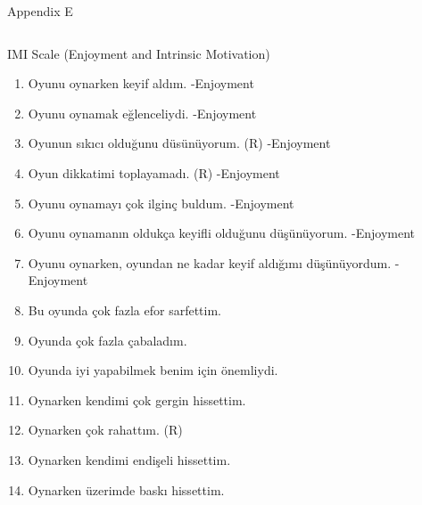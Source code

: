 \documentclass{beamer}
\begin{document}
\begin{frame}[label=appE, plain]{Appendix E}
  \begin{columns}[t]
    \begin{exampleblock}{IMI Scale (Enjoyment and Intrinsic Motivation)}
     \fontsize{8pt}{7.2}\selectfont

\begin{enumerate}
\item \alert{Oyunu oynarken keyif aldım.} -Enjoyment
\item \alert{Oyunu oynamak eğlenceliydi.} -Enjoyment
\item \alert{Oyunun sıkıcı olduğunu düsünüyorum. (R)} -Enjoyment
\item \alert{Oyun dikkatimi toplayamadı. (R)} -Enjoyment
\item \alert{Oyunu oynamayı çok ilginç buldum.} -Enjoyment
\item \alert{Oyunu oynamanın oldukça keyifli olduğunu düşünüyorum.} -Enjoyment
\item \alert{Oyunu oynarken, oyundan ne kadar keyif aldığımı düşünüyordum.} -Enjoyment
\item Bu oyunda çok fazla efor sarfettim.
\item Oyunda çok fazla çabaladım.
\item Oyunda iyi yapabilmek benim için önemliydi.
\item Oynarken kendimi çok gergin hissettim.
\item Oynarken çok rahattım. (R)
\item Oynarken kendimi endişeli hissettim.
\item Oynarken üzerimde baskı hissettim.
\end{enumerate}

    \end{exampleblock}
  \end{columns}  
\end{frame}
\end{document}
